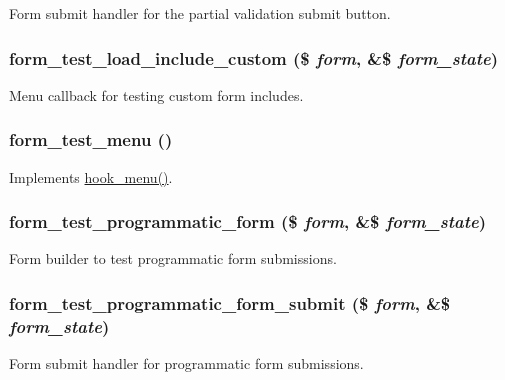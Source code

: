 \label{form__test_8module_a46767cfc135f451875071dcc5d68a309}
Form submit handler for the partial validation submit button. \hypertarget{form__test_8module_a0f5e4a794bf7e1e8ff6de2d77ba02871}{
\subsubsection[{form\_\-test\_\-load\_\-include\_\-custom}]{\setlength{\rightskip}{0pt plus 5cm}form\_\-test\_\-load\_\-include\_\-custom (\$ {\em form}, \/  \&\$ {\em form\_\-state})}}
\label{form__test_8module_a0f5e4a794bf7e1e8ff6de2d77ba02871}
Menu callback for testing custom form includes. \hypertarget{form__test_8module_a575bece07d2aeb8c80ce539ab60f5917}{
\subsubsection[{form\_\-test\_\-menu}]{\setlength{\rightskip}{0pt plus 5cm}form\_\-test\_\-menu ()}}
\label{form__test_8module_a575bece07d2aeb8c80ce539ab60f5917}
Implements \hyperlink{group__hooks_ga5c95244fea59b25666e409759e133ded}{hook\_\-menu()}. \hypertarget{form__test_8module_a991b24811c0f2ba4de1f3784f497679e}{
\subsubsection[{form\_\-test\_\-programmatic\_\-form}]{\setlength{\rightskip}{0pt plus 5cm}form\_\-test\_\-programmatic\_\-form (\$ {\em form}, \/  \&\$ {\em form\_\-state})}}
\label{form__test_8module_a991b24811c0f2ba4de1f3784f497679e}
Form builder to test programmatic form submissions. \hypertarget{form__test_8module_a90c17cc6cf6568ba05771c82e59034d8}{
\subsubsection[{form\_\-test\_\-programmatic\_\-form\_\-submit}]{\setlength{\rightskip}{0pt plus 5cm}form\_\-test\_\-programmatic\_\-form\_\-submit (\$ {\em form}, \/  \&\$ {\em form\_\-state})}}
\label{form__test_8module_a90c17cc6cf6568ba05771c82e59034d8}
Form submit handler for programmatic form submissions.

